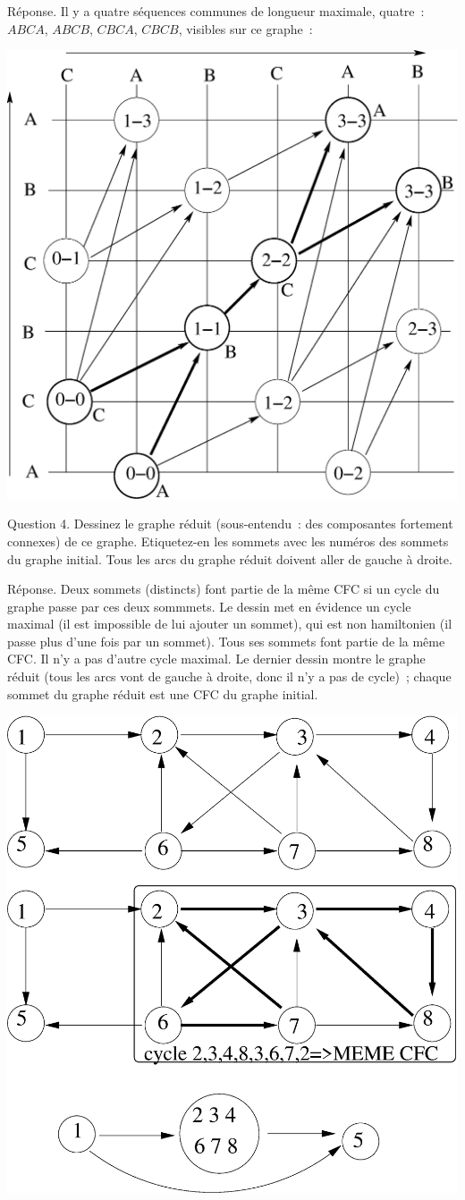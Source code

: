 \documentclass[a4paper,12pt]{article}
\begin{document}
Réponse. Il y a quatre séquences communes  de longueur  maximale, quatre~: $ABCA$, $ABCB$, $CBCA$, $CBCB$, visibles sur ce graphe~:
\begin{center}
\includegraphics[width=0.8\linewidth]{2017_seq_commune.eps}
\end{center}

Question 4. Dessinez le graphe réduit (sous-entendu~: des composantes fortement connexes) de ce graphe. Etiquetez-en les sommets avec les numéros des sommets du graphe initial. Tous les arcs du graphe réduit  doivent aller de gauche à droite.


Réponse. Deux sommets (distincts) font partie de la même CFC si un cycle du graphe passe par ces deux sommmets.  Le dessin met en évidence un cycle maximal (il est impossible de lui ajouter un sommet), qui est non hamiltonien (il passe plus d'une fois par un sommet). Tous ses sommets font partie de la même CFC.
Il n'y a pas d'autre cycle maximal.
Le dernier dessin montre le graphe réduit (tous les arcs vont de gauche à droite, donc il n'y a pas de cycle)~; chaque sommet du graphe réduit est une CFC du graphe initial.
  
\begin{center}
\includegraphics[width=0.55\linewidth]{graphe2017_cfc.eps}
\end{center}
\end{document}

